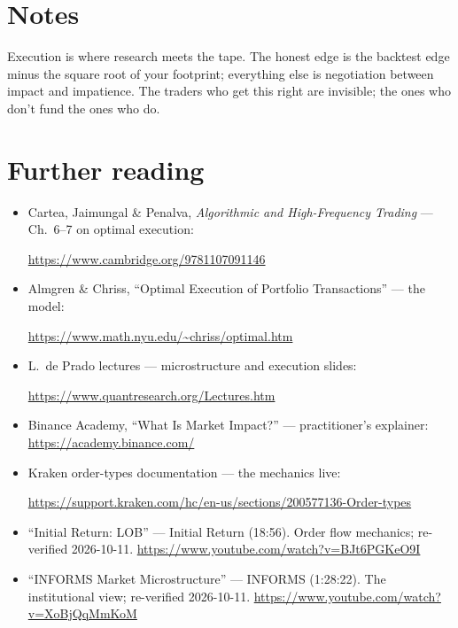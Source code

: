 \section*{Notes}
Execution is where research meets the tape. The honest edge is the backtest edge minus
the square root of your footprint; everything else is negotiation between impact and
impatience. The traders who get this right are invisible; the ones who don't fund the
ones who do.

\section*{Further reading}
\begin{itemize}
\item Cartea, Jaimungal \& Penalva, \emph{Algorithmic and High-Frequency Trading} ---
Ch.~6--7 on optimal execution:

\url{https://www.cambridge.org/9781107091146}
\item Almgren \& Chriss, ``Optimal Execution of Portfolio Transactions'' --- the model:

\url{https://www.math.nyu.edu/~chriss/optimal.htm}
\item L.~de Prado lectures --- microstructure and execution slides:

\url{https://www.quantresearch.org/Lectures.htm}
\item Binance Academy, ``What Is Market Impact?'' --- practitioner's explainer:
\url{https://academy.binance.com/}
\item Kraken order-types documentation --- the mechanics live:

\url{https://support.kraken.com/hc/en-us/sections/200577136-Order-types}
\end{itemize}

\begin{rulebox}
\begin{itemize}
\item ``Initial Return: LOB'' --- Initial Return (18:56). Order flow mechanics; re-verified
2026-10-11.
\url{https://www.youtube.com/watch?v=BJt6PGKeO9I}
\item ``INFORMS Market Microstructure'' --- INFORMS (1:28:22). The institutional view;
re-verified 2026-10-11.
\url{https://www.youtube.com/watch?v=XoBjQqMmKoM}
\end{itemize}
\end{rulebox}
